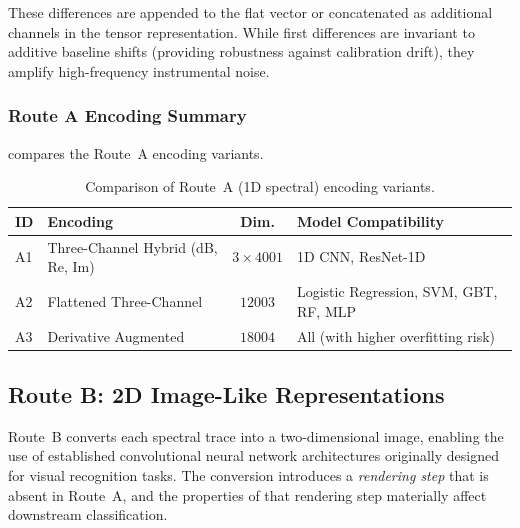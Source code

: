 These differences are appended to the flat vector or concatenated as
additional channels in the tensor representation. While first differences
are invariant to additive baseline shifts (providing robustness against
calibration drift), they amplify high-frequency instrumental noise.

\subsubsection{Route A Encoding Summary}
\label{sec:repr:routeA:summary}

 compares the Route~A encoding variants.

\begin{table}[htbp]
    \centering
    \caption{%
        Comparison of Route~A (1D spectral) encoding variants.%
    }
    \label{tab:routeA_summary}
    \small
    \begin{tabular}{llcl}
        \toprule
        \textbf{ID} & \textbf{Encoding} &
        \textbf{Dim.} & \textbf{Model Compatibility} \\
        \midrule
        A1 & Three-Channel Hybrid (dB, Re, Im) &
            $3 \times 4001$ & 1D CNN, ResNet-1D \\
        A2 & Flattened Three-Channel &
            $12003$ & Logistic Regression, SVM, GBT, RF, MLP \\
        A3 & Derivative Augmented &
            $18004$ & All (with higher overfitting risk) \\
        \bottomrule
    \end{tabular}
\end{table}

\subsection{Route B: 2D Image-Like Representations}
\label{sec:repr:routeB}

Route~B converts each spectral trace into a two-dimensional image,
enabling the use of established convolutional neural network
architectures originally designed for visual recognition tasks.  The
conversion introduces a \emph{rendering step} that is absent in Route~A,
and the properties of that rendering step materially affect downstream
classification.

